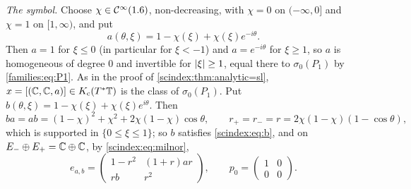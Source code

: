 \emph{The symbol.} Choose $\chi\in\mathcal{C}^\infty(1.6)$, non-decreasing, with $\chi=0$ on
$(-\infty,0]$ and $\chi=1$ on $[1,\infty)$, and put
\begin{equation*}
  a(\theta,\xi)=1-\chi(\xi)+\chi(\xi)e^{-i\theta}.
\end{equation*}
Then $a=1$ for $\xi\le0$ (in particular for $\xi<-1$) and $a=e^{-i\theta}$ for
$\xi\ge1$, so $a$ is homogeneous of degree $0$ and invertible for $\lvert \xi\rvert\ge1$,
equal there to $\sigma_0(P_1)$ by \eqref{families:eq:P1}. As in the proof of
\cref{scindex:thm:analytic=sl}, $x=[(\mathbb{C},\mathbb{C},a)]\in K_{\mathrm{c}}(T^*\mathbb{T})$ is the class of
$\sigma_0(P_1)$. Put $b(\theta,\xi)=1-\chi(\xi)+\chi(\xi)e^{i\theta}$. Then
\begin{equation*}
  ba=ab=(1-\chi)^2+\chi^2+2\chi(1-\chi)\cos\theta,\qquad
  r_+=r_-=r=2\chi(1-\chi)(1-\cos\theta),
\end{equation*}
which is supported in $\{0\le\xi\le1\}$; so $b$ satisfies \eqref{scindex:eq:b}, and
on $E_-\oplus E_+=\mathbb{C}\oplus\mathbb{C}$, by \eqref{scindex:eq:milnor},
\begin{equation*}
  e_{a,b}=\begin{pmatrix}1-r^2&(1+r)ar\\rb&r^2\end{pmatrix},\qquad
  p_0=\begin{pmatrix}1&0\\0&0\end{pmatrix}.
\end{equation*}

